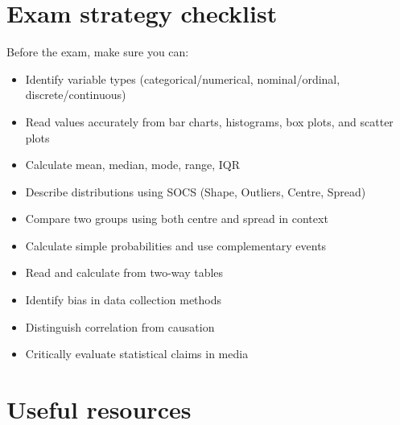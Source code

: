 \documentclass[
  11pt,
  a4paper,
  oneside,
  open=any]{scrbook}
\providecommand{\tightlist}{%
  \setlength{\itemsep}{0pt}\setlength{\parskip}{0pt}}
\begin{document}
\section{Exam strategy checklist}\label{exam-strategy-checklist}

Before the exam, make sure you can:

\begin{itemize}
\tightlist
\item[$\square$]
  Identify variable types (categorical/numerical, nominal/ordinal,
  discrete/continuous)
\item[$\square$]
  Read values accurately from bar charts, histograms, box plots, and
  scatter plots
\item[$\square$]
  Calculate mean, median, mode, range, IQR
\item[$\square$]
  Describe distributions using SOCS (Shape, Outliers, Centre, Spread)
\item[$\square$]
  Compare two groups using both centre and spread in context
\item[$\square$]
  Calculate simple probabilities and use complementary events
\item[$\square$]
  Read and calculate from two-way tables
\item[$\square$]
  Identify bias in data collection methods
\item[$\square$]
  Distinguish correlation from causation
\item[$\square$]
  Critically evaluate statistical claims in media
\end{itemize}

\section{Useful resources}\label{useful-resources}
\end{document}
